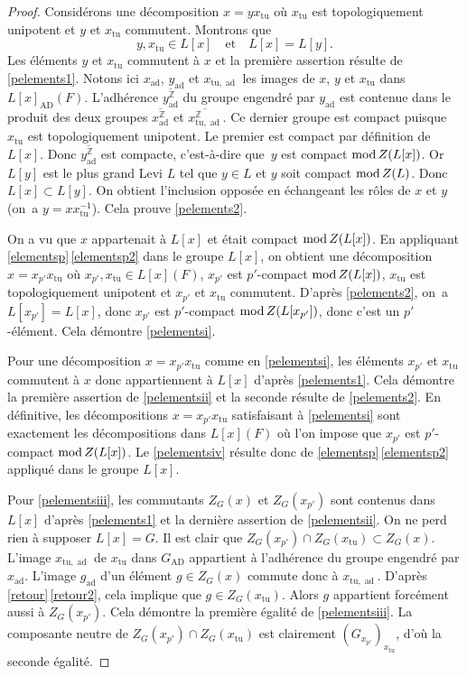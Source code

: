\documentclass[JEP,XML,SOM,Unicode,francais]{cedram}
\newcommand{\quadet}{\quad\text{et}\quad}
\newcommand{\rmod}{\textup{mod}\,}
\newcommand{\AD}{\mathrm{AD}}
\newcommand{\tu}{\mathrm{tu}}
\DeclareMathOperator{\ad}{ad}
\newcommand{\ZZ}{\mathbb{Z}}
\theoremstyle{plain}
\theoremstyle{definition}
\begin{document}
\begin{proof}
Considérons une décomposition $x=yx_{\tu}$ où $x_{\tu}$ est topologiquement unipotent et $y$ et $x_{\tu}$ commutent. Montrons que
\begin{equation}\tag{2}\label{pelements2}
y,x_{\tu}\in L[x]\quadet L[x]=L[y].
\end{equation}
Les éléments $y$ et $x_{\tu}$ commutent à $x$ et la première assertion résulte de \eqref{pelements1}. Notons ici $x_{\ad}$, $y_{\ad}$ et $x_{\tu,\ad}$ les images de $x$, $y$ et $x_{\tu}$ dans $L[x]_{\AD}(F)$. L'adhérence $\overline{y_{\ad}^{\ZZ}}$ du groupe engendré par $y_{\ad}$ est contenue dans le produit des deux groupes $\overline{x_{\ad}^{\ZZ}}$ et $\overline{x_{\tu,\ad}^{\ZZ}}$. Ce dernier groupe est compact puisque $x_{\tu}$ est topologiquement unipotent. Le premier est compact par définition de $L[x]$. Donc $\overline{y_{\ad}^{\ZZ}}$ est compacte, c'est-à-dire que~$y$ est compact $\rmod Z(L[x])$. Or $L[y]$ est le plus grand Levi $L$ tel que $y\in L$ et $y$ soit compact $\rmod Z(L)$. Donc $L[x]\subset L[y]$. On obtient l'inclusion opposée en échangeant les rôles de $x$ et $y$ (on~a $y=xx_{\tu}^{-1}$). Cela prouve \eqref{pelements2}.

On a vu que $x$ appartenait à $ L[x]$ et était compact $\rmod Z(L[x])$. En appliquant \ref{elementsp}\,\eqref{elementsp2} dans le groupe $L[x]$, on obtient une décomposition $x=x_{p'}x_{\tu}$ où $x_{p'}, x_{\tu}\in L[x](F)$, $x_{p'}$ est $p'$-compact $\rmod Z(L[x])$, $x_{\tu}$ est topologiquement unipotent et $x_{p'}$ et $x_{\tu}$ commutent. D'après \eqref{pelements2}, on~a $L[x_{p'}]=L[x]$, donc $x_{p'}$ est $p'$-compact $\rmod Z(L[x_{p'}])$, donc c'est un $p'$-élément. Cela démontre \eqref{pelementsi}.

Pour une décomposition $x=x_{p'}x_{\tu}$ comme en \eqref{pelementsi}, les éléments $x_{p'}$ et $x_{\tu}$ commutent à $x$ donc appartiennent à $L[x]$ d'après \eqref{pelements1}. Cela démontre la première assertion de \eqref{pelementsii} et la seconde résulte de \eqref{pelements2}. En définitive, les décompositions $x=x_{p'}x_{\tu}$ satisfaisant à \eqref{pelementsi} sont exactement les décompositions dans $L[x](F)$ où l'on impose que $x_{p'}$ est $p'$-compact $\rmod Z(L[x])$. Le \eqref{pelementsiv} résulte donc de \ref{elementsp}\,\eqref{elementsp2} appliqué dans le groupe $L[x]$.

Pour \eqref{pelementsiii}, les commutants $Z_{G}(x)$ et $Z_{G}(x_{p'})$ sont contenus dans $L[x]$ d'après \eqref{pelements1} et la dernière assertion de \eqref{pelementsii}. On ne perd rien à supposer $L[x]=G$. Il est clair que $Z_{G}(x_{p'})\cap Z_{G}(x_{\tu})\subset Z_{G}(x)$. L'image $x_{\tu,\ad}$ de $x_{\tu}$ dans $G_{\AD}$ appartient à l'adhérence du groupe engendré par $x_{\ad}$. L'image $g_{\ad}$ d'un élément $g\in Z_{G}(x)$ commute donc à $x_{\tu,\ad}$. D'après \ref{retour}\,\eqref{retour2}, cela implique que $g\in Z_{G}(x_{\tu})$. Alors $g$ appartient forcément aussi à $Z_{G}(x_{p'})$. Cela démontre la première égalité de \eqref{pelementsiii}. La composante neutre de $Z_{G}(x_{p'})\cap Z_{G}(x_{\tu})$ est clairement $(G_{x_{p'}})_{x_{\tu}}$, d'où la seconde égalité.
\end{proof}
\end{document}
